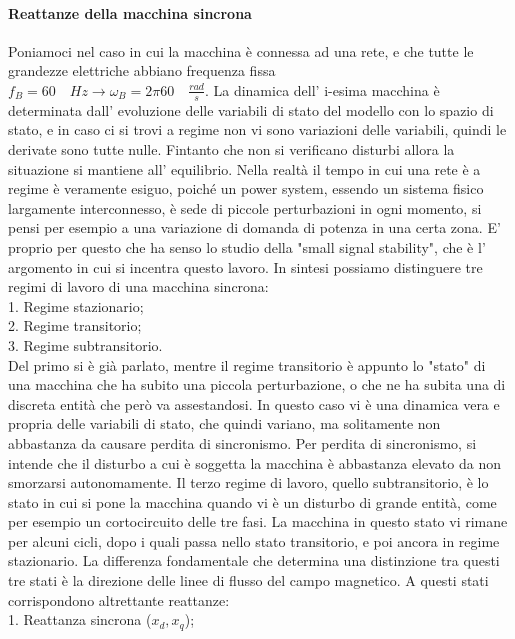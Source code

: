 \documentclass[Lau,noexaminfo]{sapthesis}
\begin{document}
	\paragraph{Reattanze della macchina sincrona}
	Poniamoci nel caso in cui la macchina è connessa ad una rete, e che tutte le grandezze elettriche abbiano frequenza fissa \\$f_B=60\quad Hz \rightarrow \omega_B=2\pi60 \quad\frac{rad}{s}$. La dinamica dell' i-esima macchina è determinata dall' evoluzione delle variabili di stato del modello con lo spazio di stato, e in caso ci si trovi a regime non vi sono variazioni delle variabili, quindi le derivate sono tutte nulle. Fintanto che non si verificano disturbi allora la situazione si mantiene all' equilibrio. Nella realtà il tempo in cui una rete è a regime è veramente esiguo, poiché un power system, essendo un sistema fisico largamente interconnesso, è sede di piccole perturbazioni in ogni momento, si pensi per esempio a una variazione di domanda di potenza in una certa zona. E' proprio per questo che ha senso lo studio della "small signal stability", che è l' argomento in cui si incentra questo lavoro. In sintesi possiamo distinguere tre regimi di lavoro di una macchina sincrona:\\
	1. Regime stazionario;\\
	2. Regime transitorio;\\
	3. Regime subtransitorio.\\
	Del primo si è già parlato, mentre il regime transitorio è appunto lo "stato" di una macchina che ha subito una piccola perturbazione, o che ne ha subita una di discreta entità che però va assestandosi. In questo caso vi è una dinamica vera e propria delle variabili di stato, che quindi variano, ma solitamente non abbastanza da causare perdita di sincronismo. Per perdita di sincronismo, si intende che il disturbo a cui è soggetta la macchina è abbastanza elevato da non smorzarsi autonomamente. Il terzo regime di lavoro, quello subtransitorio, è lo stato in cui si pone la macchina quando vi è un disturbo di grande entità, come per esempio un cortocircuito delle tre fasi. La macchina in questo stato vi rimane per alcuni cicli, dopo i quali passa nello stato transitorio, e poi ancora in regime stazionario. La differenza fondamentale che determina una distinzione tra questi tre stati è la direzione delle linee di flusso del campo magnetico. A questi stati corrispondono altrettante reattanze:\\
	1. Reattanza sincrona ($x_d, x_q$);\\
\end{document}
